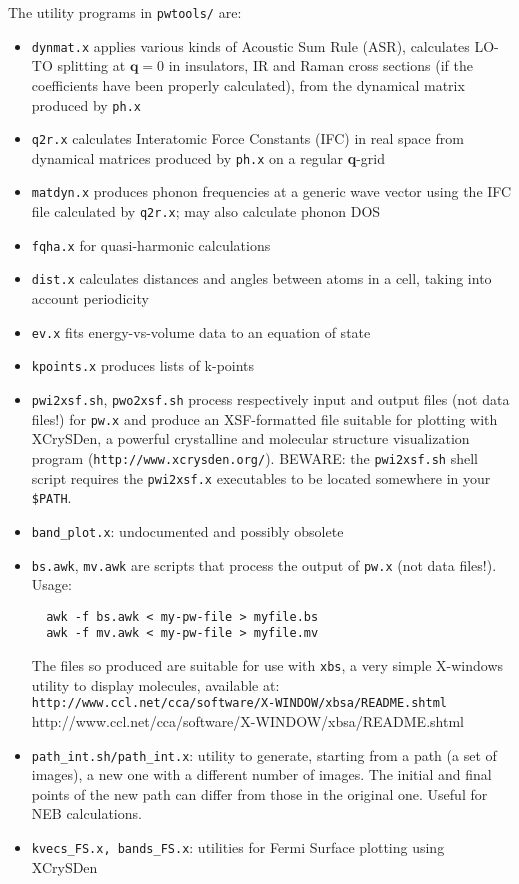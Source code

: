 \documentclass[12pt,a4paper]{article}
\begin{document}
The utility programs in \texttt{pwtools/} are:
\begin{itemize}
  \item \texttt{dynmat.x} applies various kinds of Acoustic Sum Rule
        (ASR), calculates LO-TO splitting at $\mathbf{q}=0$ in 
        insulators, IR and Raman cross sections (if the coefficients
        have been properly calculated), from the dynamical matrix
        produced by \texttt{ph.x}
  \item \texttt{q2r.x} calculates Interatomic Force Constants (IFC) in
        real space from dynamical matrices produced by
        \texttt{ph.x} on a regular \textbf{q}-grid
  \item \texttt{matdyn.x} produces phonon frequencies at a generic
        wave vector using the IFC file calculated by \texttt{q2r.x}; 
        may also calculate phonon DOS
  \item \texttt{fqha.x} for quasi-harmonic calculations
  \item \texttt{dist.x} calculates distances and angles between
        atoms in a cell, taking into account periodicity
  \item \texttt{ev.x} fits energy-vs-volume data to an equation of
        state
  \item \texttt{kpoints.x} produces lists of k-points
  \item \texttt{pwi2xsf.sh}, \texttt{pwo2xsf.sh} process
        respectively input and output files (not data files!) for
        \texttt{pw.x} and produce an XSF-formatted file suitable
        for plotting with XCrySDen, a powerful crystalline and
        molecular structure visualization program 
        (\texttt{http://www.xcrysden.org/}).
        BEWARE: the \texttt{pwi2xsf.sh} shell script requires the
        \texttt{pwi2xsf.x} executables to be located somewhere in
        your \texttt{\$PATH}.
  \item \texttt{band\_plot.x}: undocumented and possibly obsolete
  \item \texttt{bs.awk}, \texttt{mv.awk} are scripts that process
        the output of \texttt{pw.x} (not data files!).
        Usage:
\begin{verbatim}
  awk -f bs.awk < my-pw-file > myfile.bs
  awk -f mv.awk < my-pw-file > myfile.mv
\end{verbatim}
        The files so produced are suitable for use with
        \texttt{xbs}, a very simple X-windows utility to display
        molecules, available at:\hfill\break
        \htmladdnormallink%
        {\texttt{http://www.ccl.net/cca/software/X-WINDOW/xbsa/README.shtml}}%
        {http://www.ccl.net/cca/software/X-WINDOW/xbsa/README.shtml}
\item \texttt{path\_int.sh/path\_int.x}: utility to generate, starting
        from a path (a set of images), a new one with a different number of
        images. The initial and final points of the new path can differ
        from those in the original one. Useful for NEB calculations.
  \item \texttt{kvecs\_FS.x, bands\_FS.x}: utilities for Fermi Surface
        plotting using XCrySDen
\end{itemize}
\end{document}
